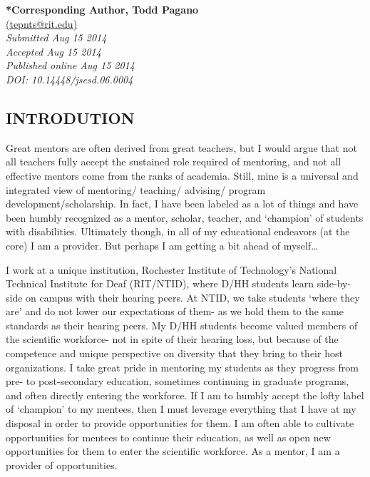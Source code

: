 \documentclass[11.5pt]{sig-alternate} %
\begin{document}
\textbf{*Corresponding Author, Todd Pagano}\\
\href{mailto: tepnts@rit.edu }{(tepnts@rit.edu)} \\
\textit{Submitted  Aug 15 2014}\\
\textit{Accepted Aug 15 2014} \\
\textit{Published online Aug 15 2014} \\
\textit{DOI: 10.14448/jsesd.06.0004} \\
\pagebreak
\clearpage
\begin{large}
\section*{INTRODUTION}
    
Great mentors are often derived from great teachers, but I would argue that not all teachers fully accept the sustained role required of mentoring, and not all effective mentors come from the ranks of academia. Still, mine is a universal and integrated view of mentoring/ teaching/ advising/ program development/scholarship. In fact, I have been labeled as a lot of things and have been humbly recognized as a mentor, scholar, teacher, and ‘champion’ of students with disabilities. Ultimately though, in all of my educational endeavors (at the core) I am a provider. But perhaps I am getting a bit ahead of myself…

I work at a unique institution, Rochester Institute of Technology’s National Technical Institute for Deaf (RIT/NTID), where D/HH students learn side-by-side on campus with their hearing peers. At NTID, we take students ‘where they are’ and do not lower our expectations of them- as we hold them to the same standards as their hearing peers. My D/HH students become valued members of the scientific workforce- not in spite of their hearing loss, but because of the competence and unique perspective on diversity that they bring to their host organizations. I take great pride in mentoring my students as they progress from pre- to post-secondary education, sometimes continuing in graduate programs, and often directly entering the workforce. If I am to humbly accept the lofty label of ‘champion’ to my mentees, then I must leverage everything that I have at my disposal in order to provide opportunities for them. I am often able to cultivate opportunities for mentees to continue their education, as well as open new opportunities for them to enter the scientific workforce. As a mentor, I am a provider of opportunities.


\end{large}
\end{document}
